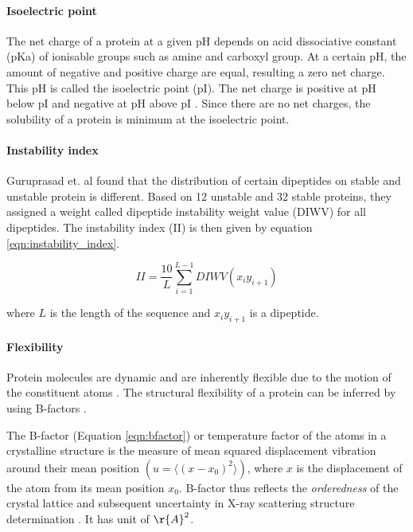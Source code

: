 \paragraph{Isoelectric point}
The net charge of a protein at a given pH depends on acid dissociative constant (pKa) of ionisable groups such as amine and carboxyl group. At a certain pH, the amount of negative and positive charge are equal, resulting a zero net charge. This pH is called the isoelectric point (pI). The net charge is positive at pH below pI and negative at pH above pI \cite{shaw2001effect}. Since there are no net charges, the solubility of a protein is minimum at the isoelectric point.

\paragraph{Instability index}
Guruprasad et. al \cite{guruprasad1990correlation} found that the distribution of certain dipeptides on stable and unstable protein is different. Based on 12 unstable and 32 stable proteins, they assigned a weight called dipeptide instability weight value (DIWV) for all dipeptides. The instability index (II) is then given by equation \ref{eqn:instability_index}.

\begin{equation}
    II = \frac{10}{L}\sum_{i=1}^{L-1}DIWV(x_i y_{i+1})
    \label{eqn:instability_index}
\end{equation}

where $L$ is the length of the sequence and $x_i y_{i+1}$ is a dipeptide.


\paragraph{Flexibility}
Protein molecules are dynamic and are inherently flexible due to the motion of the constituent atoms \cite{vihinen1994accuracy, alvarez2014relationship, teilum2009functional}. The structural flexibility of a protein can be inferred by using B-factors \cite{vihinen1994accuracy, Karplus1985-ea, Smith2003-gb}.


The B-factor (Equation \ref{eqn:bfactor}) or temperature factor of the atoms in a crystalline structure is the measure of mean squared displacement vibration around their mean position $(u = \langle (x-x_0)^2 \rangle)$, where $x$ is the displacement of the atom from its mean position $x_0$. B-factor thus reflects the \textit{orderedness} of the crystal lattice and subsequent uncertainty in X-ray scattering structure determination \cite{Schlessinger2005-ps, Carugo2018-ka, Bramer2018-dh}. It has unit of $\r{A}^2$.


